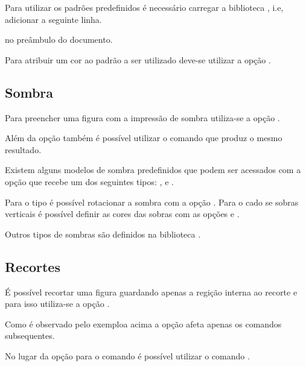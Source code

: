 Para utilizar os padr\~{o}es predefinidos \'{e} necess\'{a}rio carregar a biblioteca , i.e, adicionar a seguinte linha.
\begin{code}
    \usetikzlibrary{patterns}
\end{code}
no pre\^{a}mbulo do documento.


Para atribuir um cor ao padr\~{a}o a ser utilizado deve-se utilizar a op\c{c}\~{a}o .


\subsection{Sombra}
Para preencher uma figura com a impress\~{a}o de sombra utiliza-se a op\c{c}\~{a}o .


Al\'{e}m da op\c{c}\~{a}o  tamb\'{e}m \'{e} poss\'{i}vel utilizar o comando  que produz o mesmo resultado.

Existem alguns modelos de sombra predefinidos que podem ser acessados com a op\c{c}\~{a}o  que recebe um dos seguintes tipos: ,  e .


Para o tipo  \'{e} poss\'{i}vel rotacionar a sombra com a op\c{c}\~{a}o . Para o cado se sobras verticais \'{e} poss\'{i}vel definir as cores das sobras com as op\c{c}\~{o}es  e .


Outros tipos de sombras s\~{a}o definidos na biblioteca .

\subsection{Recortes}
\'{E} poss\'{i}vel recortar uma figura guardando apenas a regi\c{c}\~{a}o interna ao recorte e para isso utiliza-se a op\c{c}\~{a}o .


Como \'{e} observado pelo exemploa acima a op\c{c}\~{a}o  afeta apenas os comandos subsequentes.

No lugar da op\c{c}\~{a}o  para o comando  \'{e} poss\'{i}vel utilizar o comando .
